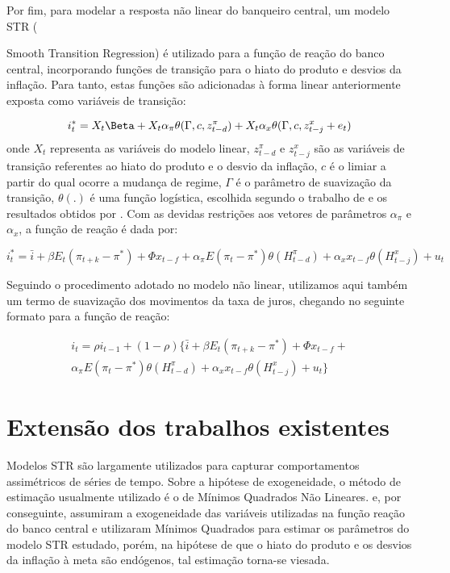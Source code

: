 \documentclass[
	article,			%
	11pt,				%
	oneside,			%
	a4paper,			%
	english,			%
	brazil,				%
	]{abntex2}
\begin{document}
	Por fim, para modelar a resposta não linear do banqueiro central, um modelo STR (\it{Smooth Transition Regression) é utilizado para a função de reação do banco central, incorporando funções de transição para o hiato do produto e desvios da inflação. Para tanto, estas funções são adicionadas à forma linear anteriormente exposta como variáveis de transição:
	
	\begin{equation}
		i_t^* = X_t \Beta + X_t \alpha_\pi \theta(\Gamma,c,z_{t-d}^\pi) + X_t \alpha_x \theta (\Gamma,c,z_{t-j}^x+e_t)
	\end{equation}
	onde $X_t$ representa as variáveis do modelo linear, $z_{t-d}^\pi$ e $z_{t-j}^x$ são as variáveis de transição referentes ao hiato do produto e o desvio da inflação, $c$ é o limiar a partir do qual ocorre a mudança de regime, $\Gamma$ é o parâmetro de suavização da transição, $\theta(.)$ é uma função logística, escolhida segundo o trabalho de  e os resultados obtidos por . Com as devidas restrições aos vetores de parâmetros $\alpha_\pi$ e $\alpha_x$, a função de reação é dada por:
	
	\begin{equation}
		i_t^* = \bar{i} + \beta E_t(\pi_{t+k} - \pi^*) + \Phi x_{t-f} + \alpha_\pi E(\pi_t - \pi^*)\theta(H_{t-d}^\pi) + \alpha_x x_{t-f} \theta (H_{t-j}^x) + u_t
	\end{equation}
	
	Seguindo o procedimento adotado no modelo não linear, utilizamos aqui também um termo de suavização dos movimentos da taxa de juros, chegando no seguinte formato para a função de reação:
	
	\begin{eqnarray}  \label{modelo_nao_linear}
		i_t = \rho i_{t-1} + (1-\rho) \{ \bar{i} + \beta E_t(\pi_{t+k} - \pi^*) + \Phi x_{t-f} + \nonumber \\ 
		 \alpha_\pi E(\pi_t - \pi^*)\theta(H_{t-d}^\pi) + \alpha_x x_{t-f} \theta (H_{t-j}^x) + u_t \}
	\end{eqnarray}
	
	\section{Extensão dos trabalhos existentes}	
	
	Modelos STR são largamente utilizados para capturar comportamentos assimétricos de séries de tempo. Sobre a hipótese de exogeneidade, o método de estimação usualmente utilizado é o de Mínimos Quadrados Não Lineares.  e, por conseguinte,  assumiram a exogeneidade das variáveis utilizadas na função reação do banco central e utilizaram Mínimos Quadrados para estimar os parâmetros do modelo STR estudado, porém, na hipótese de que o hiato do produto e os desvios da inflação à meta são endógenos, tal estimação torna-se viesada.
	
}
\end{document}
